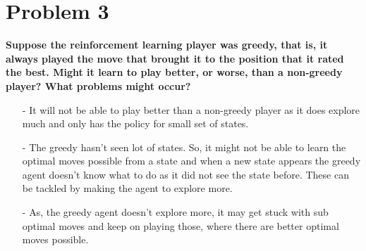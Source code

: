 \documentclass [11pt]{article}
\numberwithin{equation}{section}
\begin{document}
\vspace{0.5cm}

\section*{Problem 3}
\textbf{Suppose the reinforcement learning player was greedy, that is, it always played the move that brought it to the position that it rated the best. Might it learn to play better, or worse, than a non-greedy player? What problems might occur?}
\begin{itemize}
    \item[-] It will not be able to play better than a non-greedy player as it does explore much and only has the policy for small set of states.
    \item[-] The greedy hasn't seen lot of states. So, it might not be able to learn the optimal moves possible from a state and when a new state appears the greedy agent doesn't know what to do as it did not see the state before. These can be tackled by making the agent to explore more.  
    \item[-] As, the greedy agent doesn't explore more, it may get stuck with sub optimal moves and keep on playing those, where there are better optimal moves possible.
\end{itemize}

\vspace{0.5cm}
\end{document}
